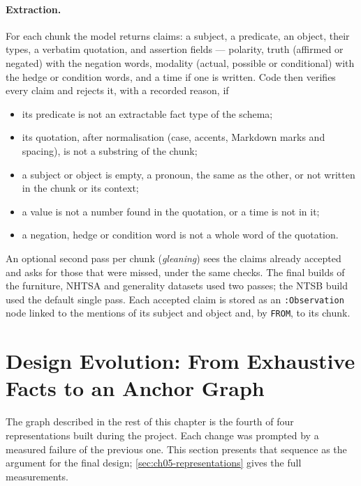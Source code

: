 \paragraph{Extraction.} For each chunk the model returns claims: a subject, a predicate, an object, their types,
a verbatim quotation, and assertion fields --- polarity, truth (affirmed or negated) with the negation words,
modality (actual, possible or conditional) with the hedge or condition words, and a time if one is written. Code
then verifies every claim and rejects it, with a recorded reason, if
\begin{itemize}[nosep]
\item its predicate is not an extractable fact type of the schema;
\item its quotation, after normalisation (case, accents, Markdown marks and spacing), is not a substring of the
chunk;
\item a subject or object is empty, a pronoun, the same as the other, or not written in the chunk or its context;
\item a value is not a number found in the quotation, or a time is not in it;
\item a negation, hedge or condition word is not a whole word of the quotation.
\end{itemize}
An optional second pass per chunk (\emph{gleaning}) sees the claims already accepted and asks for those that
were missed, under the same checks. The final builds of the furniture, NHTSA and generality datasets used two
passes; the NTSB build used the default single pass. Each accepted claim is stored as an
\texttt{:Observation} node linked to the mentions of its subject and object and, by \texttt{FROM}, to its chunk.

\section{Design Evolution: From Exhaustive Facts to an Anchor Graph}\label{sec:ch04-evolution}

The graph described in the rest of this chapter is the fourth of four representations built during the project.
Each change was prompted by a measured failure of the previous one. This section presents that sequence as the
argument for the final design; \cref{sec:ch05-representations} gives the full measurements.

